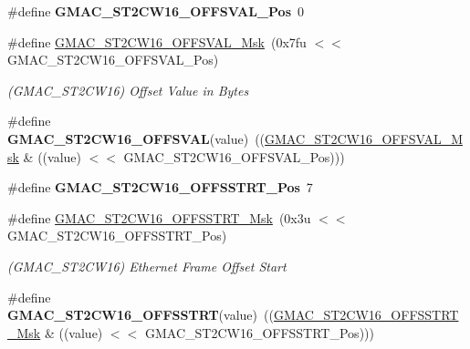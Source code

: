 \begin{DoxyCompactItemize}
\item 
\mbox{\label{group__SAME70__GMAC_ga21aafac15e41eb177f84b26e53935d90}} 
\#define {\bfseries G\+M\+A\+C\+\_\+\+S\+T2\+C\+W16\+\_\+\+O\+F\+F\+S\+V\+A\+L\+\_\+\+Pos}~0
\item 
\mbox{\label{group__SAME70__GMAC_ga8bc12c0a6e710b9b77d1e9c964417dd1}} 
\#define \mbox{\hyperlink{group__SAME70__GMAC_ga8bc12c0a6e710b9b77d1e9c964417dd1}{G\+M\+A\+C\+\_\+\+S\+T2\+C\+W16\+\_\+\+O\+F\+F\+S\+V\+A\+L\+\_\+\+Msk}}~(0x7fu $<$$<$ G\+M\+A\+C\+\_\+\+S\+T2\+C\+W16\+\_\+\+O\+F\+F\+S\+V\+A\+L\+\_\+\+Pos)
\begin{DoxyCompactList}\small\item\em (G\+M\+A\+C\+\_\+\+S\+T2\+C\+W16) Offset Value in Bytes \end{DoxyCompactList}\item 
\mbox{\label{group__SAME70__GMAC_ga7901995a5d56f8db8c8522173dc041a8}} 
\#define {\bfseries G\+M\+A\+C\+\_\+\+S\+T2\+C\+W16\+\_\+\+O\+F\+F\+S\+V\+AL}(value)~((\mbox{\hyperlink{group__SAMV71__GMAC_ga8bc12c0a6e710b9b77d1e9c964417dd1}{G\+M\+A\+C\+\_\+\+S\+T2\+C\+W16\+\_\+\+O\+F\+F\+S\+V\+A\+L\+\_\+\+Msk}} \& ((value) $<$$<$ G\+M\+A\+C\+\_\+\+S\+T2\+C\+W16\+\_\+\+O\+F\+F\+S\+V\+A\+L\+\_\+\+Pos)))
\item 
\mbox{\label{group__SAME70__GMAC_ga44acc2045ff0f4f04c7923c8c2a3b9b1}} 
\#define {\bfseries G\+M\+A\+C\+\_\+\+S\+T2\+C\+W16\+\_\+\+O\+F\+F\+S\+S\+T\+R\+T\+\_\+\+Pos}~7
\item 
\mbox{\label{group__SAME70__GMAC_gaecb951a57ec8351828cf0b355bd601c1}} 
\#define \mbox{\hyperlink{group__SAME70__GMAC_gaecb951a57ec8351828cf0b355bd601c1}{G\+M\+A\+C\+\_\+\+S\+T2\+C\+W16\+\_\+\+O\+F\+F\+S\+S\+T\+R\+T\+\_\+\+Msk}}~(0x3u $<$$<$ G\+M\+A\+C\+\_\+\+S\+T2\+C\+W16\+\_\+\+O\+F\+F\+S\+S\+T\+R\+T\+\_\+\+Pos)
\begin{DoxyCompactList}\small\item\em (G\+M\+A\+C\+\_\+\+S\+T2\+C\+W16) Ethernet Frame Offset Start \end{DoxyCompactList}\item 
\mbox{\label{group__SAME70__GMAC_ga2673a4d4eb595e7b07d37a47c64a2410}} 
\#define {\bfseries G\+M\+A\+C\+\_\+\+S\+T2\+C\+W16\+\_\+\+O\+F\+F\+S\+S\+T\+RT}(value)~((\mbox{\hyperlink{group__SAMV71__GMAC_gaecb951a57ec8351828cf0b355bd601c1}{G\+M\+A\+C\+\_\+\+S\+T2\+C\+W16\+\_\+\+O\+F\+F\+S\+S\+T\+R\+T\+\_\+\+Msk}} \& ((value) $<$$<$ G\+M\+A\+C\+\_\+\+S\+T2\+C\+W16\+\_\+\+O\+F\+F\+S\+S\+T\+R\+T\+\_\+\+Pos)))

\end{DoxyCompactItemize}

